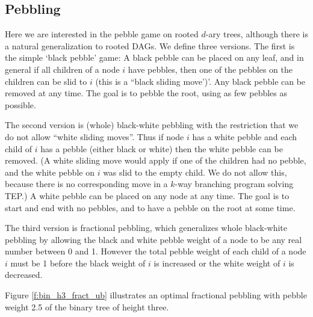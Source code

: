 \documentclass[oribib1]{llncs}
\begin{document}
\subsection{Pebbling}

Here we are interested in the pebble game on rooted $d$-ary trees,
although there is a natural generalization to rooted DAGs.
We define three versions.
The first is the simple `black pebble' game:  A black
pebble can be placed on any leaf, and in general
if all children of a node $i$ have pebbles, then one of the
pebbles on the children can be slid to $i$ (this is a
``black sliding move')'.  Any black pebble can be removed
at any time.  The goal is to pebble the root, using as few
pebbles as possible.

The second version is (whole) black-white pebbling
with the restriction that we do not allow
``white sliding moves''.  Thus if node $i$ has a white
pebble and each child of $i$ has a pebble (either black or white)
then the white pebble can be removed.  (A white sliding move
would apply if one of the children had no pebble, and the
white pebble on $i$ was slid to the empty child.  We do not
allow this, because there is no corresponding move in a $k$-way branching
program solving TEP.)  A white pebble can be placed on any node at
any time.  The goal is to start and end with no pebbles,
and to have a pebble on the root at some time.

The third version is fractional pebbling,
which generalizes whole black-white pebbling by allowing the
black and white pebble weight of a node to be any real number
between 0 and 1.  However the total pebble weight of each
child of a node $i$ must be 1 before the black weight of $i$
is increased or the white weight of $i$ is decreased.

Figure \ref{f:bin_h3_fract_ub} illustrates
an optimal fractional pebbling with pebble weight 2.5 of the binary tree of
height three.
\end{document}
